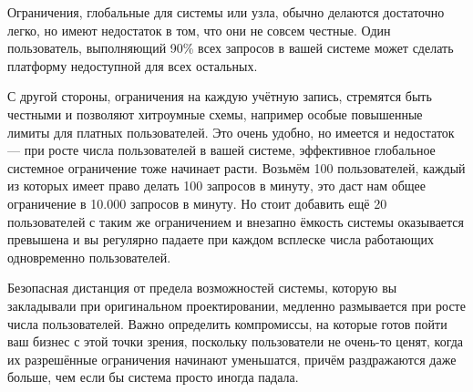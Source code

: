 \documentclass[11pt, oneside]{book}   	%
\begin{document}
Ограничения, глобальные для системы или узла, обычно делаются достаточно легко, но имеют недостаток в том, что они не совсем честные. Один пользователь, выполняющий 90\% всех запросов в вашей системе может сделать платформу недоступной для всех остальных.

С другой стороны, ограничения на каждую учётную запись, стремятся быть честными и позволяют хитроумные схемы, например особые повышенные лимиты для платных пользователей. Это очень удобно, но имеется и недостаток --- при росте числа пользователей в вашей системе, эффективное глобальное системное ограничение тоже начинает расти. Возьмём 100 пользователей, каждый из которых имеет право делать 100 запросов в минуту, это даст нам общее ограничение в 10.000 запросов в минуту. Но стоит добавить ещё 20 пользователей с таким же ограничением и внезапно ёмкость системы оказывается превышена и вы регулярно падаете при каждом всплеске числа работающих одновременно пользователей.

Безопасная дистанция от предела возможностей системы, которую вы закладывали при оригинальном проектировании, медленно размывается при росте числа пользователей. Важно определить компромиссы, на которые готов пойти ваш бизнес с этой точки зрения, поскольку пользователи не очень-то ценят, когда их разрешённые ограничения начинают уменьшатся, причём раздражаются даже больше, чем если бы система просто иногда падала.


\end{document}
